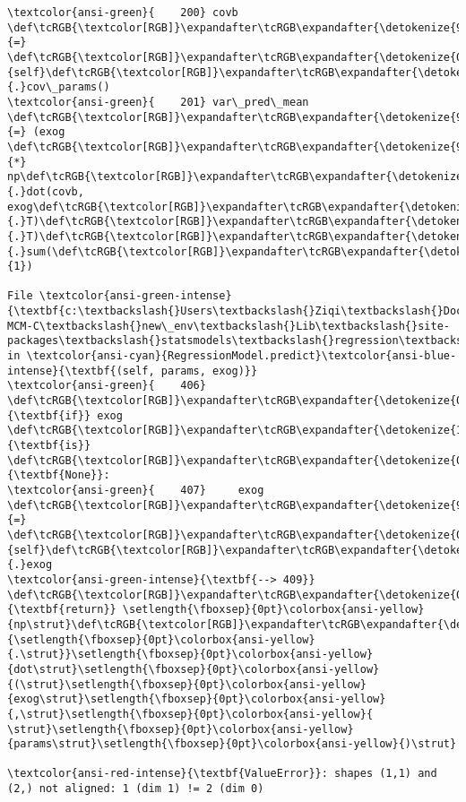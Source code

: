 \documentclass[11pt]{article}
\begin{document}
\begin{Verbatim}[commandchars=\\\{\}, frame=single, framerule=2mm, rulecolor=\color{outerrorbackground}]
\textcolor{ansi-green}{    200} covb \def\tcRGB{\textcolor[RGB]}\expandafter\tcRGB\expandafter{\detokenize{98,98,98}}{=} \def\tcRGB{\textcolor[RGB]}\expandafter\tcRGB\expandafter{\detokenize{0,135,0}}{self}\def\tcRGB{\textcolor[RGB]}\expandafter\tcRGB\expandafter{\detokenize{98,98,98}}{.}cov\_params()
\textcolor{ansi-green}{    201} var\_pred\_mean \def\tcRGB{\textcolor[RGB]}\expandafter\tcRGB\expandafter{\detokenize{98,98,98}}{=} (exog \def\tcRGB{\textcolor[RGB]}\expandafter\tcRGB\expandafter{\detokenize{98,98,98}}{*} np\def\tcRGB{\textcolor[RGB]}\expandafter\tcRGB\expandafter{\detokenize{98,98,98}}{.}dot(covb, exog\def\tcRGB{\textcolor[RGB]}\expandafter\tcRGB\expandafter{\detokenize{98,98,98}}{.}T)\def\tcRGB{\textcolor[RGB]}\expandafter\tcRGB\expandafter{\detokenize{98,98,98}}{.}T)\def\tcRGB{\textcolor[RGB]}\expandafter\tcRGB\expandafter{\detokenize{98,98,98}}{.}sum(\def\tcRGB{\textcolor[RGB]}\expandafter\tcRGB\expandafter{\detokenize{98,98,98}}{1})

File \textcolor{ansi-green-intense}{\textbf{c:\textbackslash{}Users\textbackslash{}Ziqi\textbackslash{}Documents\textbackslash{}Python\textbackslash{}2025-MCM-C\textbackslash{}new\_env\textbackslash{}Lib\textbackslash{}site-packages\textbackslash{}statsmodels\textbackslash{}regression\textbackslash{}linear\_model.py:409}}, in \textcolor{ansi-cyan}{RegressionModel.predict}\textcolor{ansi-blue-intense}{\textbf{(self, params, exog)}}
\textcolor{ansi-green}{    406} \def\tcRGB{\textcolor[RGB]}\expandafter\tcRGB\expandafter{\detokenize{0,135,0}}{\textbf{if}} exog \def\tcRGB{\textcolor[RGB]}\expandafter\tcRGB\expandafter{\detokenize{175,0,255}}{\textbf{is}} \def\tcRGB{\textcolor[RGB]}\expandafter\tcRGB\expandafter{\detokenize{0,135,0}}{\textbf{None}}:
\textcolor{ansi-green}{    407}     exog \def\tcRGB{\textcolor[RGB]}\expandafter\tcRGB\expandafter{\detokenize{98,98,98}}{=} \def\tcRGB{\textcolor[RGB]}\expandafter\tcRGB\expandafter{\detokenize{0,135,0}}{self}\def\tcRGB{\textcolor[RGB]}\expandafter\tcRGB\expandafter{\detokenize{98,98,98}}{.}exog
\textcolor{ansi-green-intense}{\textbf{--> 409}} \def\tcRGB{\textcolor[RGB]}\expandafter\tcRGB\expandafter{\detokenize{0,135,0}}{\textbf{return}} \setlength{\fboxsep}{0pt}\colorbox{ansi-yellow}{np\strut}\def\tcRGB{\textcolor[RGB]}\expandafter\tcRGB\expandafter{\detokenize{98,98,98}}{\setlength{\fboxsep}{0pt}\colorbox{ansi-yellow}{.\strut}}\setlength{\fboxsep}{0pt}\colorbox{ansi-yellow}{dot\strut}\setlength{\fboxsep}{0pt}\colorbox{ansi-yellow}{(\strut}\setlength{\fboxsep}{0pt}\colorbox{ansi-yellow}{exog\strut}\setlength{\fboxsep}{0pt}\colorbox{ansi-yellow}{,\strut}\setlength{\fboxsep}{0pt}\colorbox{ansi-yellow}{ \strut}\setlength{\fboxsep}{0pt}\colorbox{ansi-yellow}{params\strut}\setlength{\fboxsep}{0pt}\colorbox{ansi-yellow}{)\strut}

\textcolor{ansi-red-intense}{\textbf{ValueError}}: shapes (1,1) and (2,) not aligned: 1 (dim 1) != 2 (dim 0)
    \end{Verbatim}


    
    
    
\end{document}

